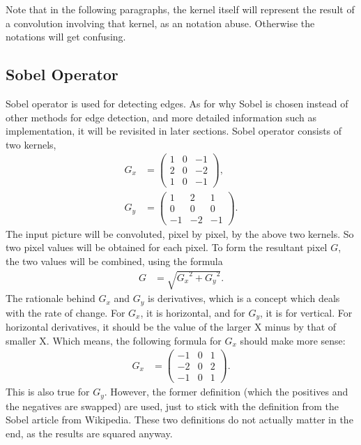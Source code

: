 \documentclass{article}
\begin{document}
		Note that in the following paragraphs, the kernel itself will represent the result of a convolution involving that kernel, as an notation abuse. Otherwise the notations will get confusing.
		
	\subsection{Sobel Operator}
	Sobel operator is used for detecting edges. As for why Sobel is chosen instead of other methods for edge detection, and more detailed information such as implementation, it will be revisited in later sections. Sobel operator consists of two kernels,
	\begin{align*}
		G_x&=
		\begin{pmatrix}
			1&0&-1\\
			2&0&-2\\
			1&0&-1
		\end{pmatrix},\\
		G_y&=
		\begin{pmatrix}
			1&2&1\\
			0&0&0\\
			-1&-2&-1
		\end{pmatrix}.
	\end{align*}
	The input picture will be convoluted, pixel by pixel, by the above two kernels. So two pixel values will be obtained for each pixel. To form the resultant pixel $G$, the two values will be combined, using the formula
	\begin{align*}
		G&=\sqrt{{G_x}^2+{G_y}^2}.
	\end{align*}
	The rationale behind $G_x$ and $G_y$ is derivatives, which is a concept which deals with the rate of change. For $G_x$, it is horizontal, and for $G_y$, it is for vertical. For horizontal derivatives, it should be the value of the larger X minus by that of smaller X. Which means, the following formula for $G_x$ should make more sense:
	\begin{align*}
		G_x&=
		\begin{pmatrix}
			-1&0&1\\
			-2&0&2\\
			-1&0&1
		\end{pmatrix}.
	\end{align*}
	This is also true for $G_y$. However, the former definition (which the positives and the negatives are swapped) are used, just to stick with the definition from the Sobel article from Wikipedia. These two definitions do not actually matter in the end, as the results are squared anyway.
	
\end{document}
